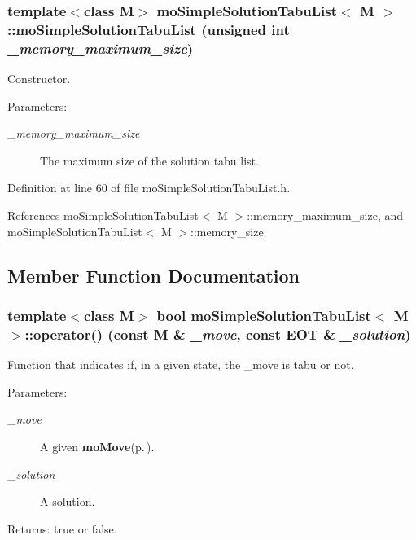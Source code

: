 \subsubsection{\setlength{\rightskip}{0pt plus 5cm}template$<$class M$>$ {\bf mo\-Simple\-Solution\-Tabu\-List}$<$ M $>$::{\bf mo\-Simple\-Solution\-Tabu\-List} (unsigned int {\em \_\-memory\_\-maximum\_\-size})\hspace{0.3cm}{\tt  [inline]}}\label{classmo_simple_solution_tabu_list_a0}


Constructor. 

\begin{Desc}
\item[Parameters:]
\begin{description}
\item[{\em \_\-memory\_\-maximum\_\-size}]The maximum size of the solution tabu list. \end{description}
\end{Desc}


Definition at line 60 of file mo\-Simple\-Solution\-Tabu\-List.h.

References mo\-Simple\-Solution\-Tabu\-List$<$ M $>$::memory\_\-maximum\_\-size, and mo\-Simple\-Solution\-Tabu\-List$<$ M $>$::memory\_\-size.

\subsection{Member Function Documentation}
\subsubsection{\setlength{\rightskip}{0pt plus 5cm}template$<$class M$>$ bool {\bf mo\-Simple\-Solution\-Tabu\-List}$<$ M $>$::operator() (const M \& {\em \_\-move}, const {\bf EOT} \& {\em \_\-solution})\hspace{0.3cm}{\tt  [inline]}}\label{classmo_simple_solution_tabu_list_a1}


Function that indicates if, in a given state, the \_\-move is tabu or not. 

\begin{Desc}
\item[Parameters:]
\begin{description}
\item[{\em \_\-move}]A given {\bf mo\-Move}{\rm (p.\,\pageref{classmo_move})}. \item[{\em \_\-solution}]A solution. \end{description}
\end{Desc}
\begin{Desc}
\item[Returns:]true or false. \end{Desc}


